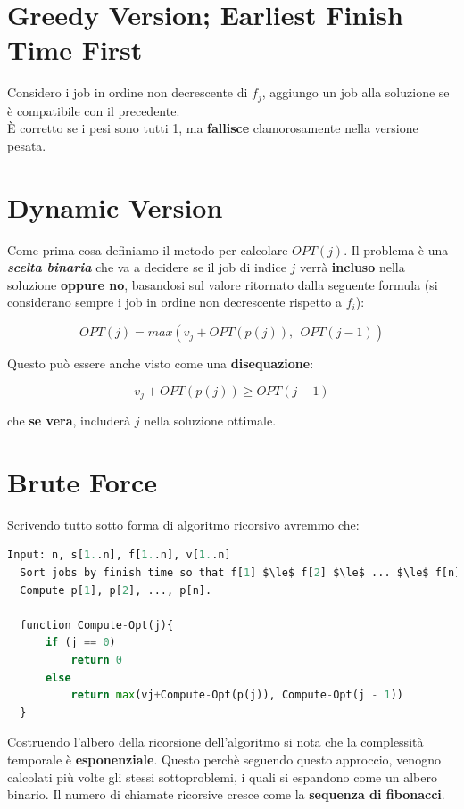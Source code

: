 \section{Greedy Version; Earliest Finish Time First}

Considero i job in ordine non decrescente di $f_j$, aggiungo un job
alla soluzione se è compatibile con il precedente.\\
È corretto se i pesi sono tutti 1, ma \textbf{fallisce} clamorosamente
nella versione pesata.

\section{Dynamic Version}

Come prima cosa definiamo il metodo per calcolare $OPT(j)$. Il
problema è una \textbf{\emph{scelta binaria}} che va a decidere se il
job di indice $j$ verrà \textbf{incluso} nella soluzione
\textbf{oppure no}, basandosi sul valore ritornato dalla seguente
formula (si considerano sempre i job in ordine non decrescente rispetto
a $f_i$):

$$
  OPT(j) = max(v_j + OPT(p(j)), \ \ OPT(j-1))
$$

Questo può essere anche visto come una \textbf{disequazione}:

$$
  v_j + OPT(p(j)) \geq OPT(j-1)
$$

che \textbf{se vera}, includerà $j$ nella soluzione ottimale.


\section{Brute Force}

Scrivendo tutto sotto forma di algoritmo ricorsivo avremmo che:

\begin{lstlisting}[language=Python, mathescape=true]
  Input: n, s[1..n], f[1..n], v[1..n]
  Sort jobs by finish time so that f[1] $\le$ f[2] $\le$ ... $\le$ f[n]. 
  Compute p[1], p[2], ..., p[n].
  
  function Compute-Opt(j){
      if (j == 0)
          return 0
      else
          return max(vj+Compute-Opt(p(j)), Compute-Opt(j - 1))
  }
\end{lstlisting}

Costruendo l'albero della ricorsione dell'algoritmo si nota che la
complessità temporale è \textbf{esponenziale}. Questo perchè seguendo
questo approccio, venogno calcolati più volte gli stessi sottoproblemi,
i quali si espandono come un albero binario. Il numero di chiamate
ricorsive cresce come la \textbf{sequenza di fibonacci}.

